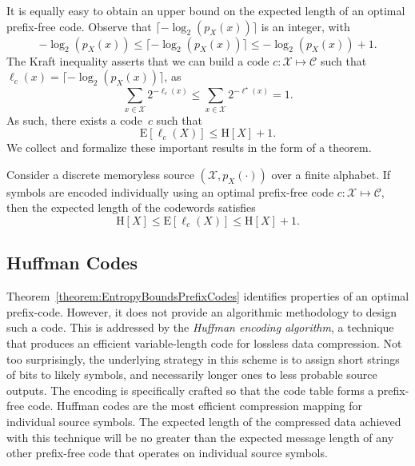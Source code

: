 It is equally easy to obtain an upper bound on the expected length of an optimal prefix-free code.
Observe that $\lceil - \log_2 (p_X(x)) \rceil$ is an integer, with
\begin{equation*}
- \log_2 (p_X(x))
\leq \lceil - \log_2 (p_X(x)) \rceil
\leq - \log_2 (p_X(x)) + 1 .
\end{equation*}
The Kraft inequality asserts that we can build a code $c : \mathcal{X} \mapsto \mathcal{C}$ such that $\ell_c(x) = \lceil - \log_2 (p_X(x)) \rceil$, as
\begin{equation*}
\sum_{x \in \mathcal{X}} 2^{- \ell_c(x)}
\leq \sum_{x \in \mathcal{X}} 2^{- \ell^{\star}(x)} = 1 .
\end{equation*}
As such, there exists a code~$c$ such that
\begin{equation*}
\mathrm{E} [\ell_c(X)] \leq \mathrm{H}[X] + 1 .
\end{equation*}
We collect and formalize these important results in the form of a theorem.

\begin{theorem} \label{theorem:EntropyBoundsPrefixCodes}
Consider a discrete memoryless source $(\mathcal{X}, p_X(\cdot))$ over a finite alphabet.
If symbols are encoded individually using an optimal prefix-free code $c : \mathcal{X} \mapsto \mathcal{C}$, then the expected length of the codewords satisfies
\begin{equation*}
\mathrm{H}[X] \leq \mathrm{E} [\ell_c(X)] \leq \mathrm{H}[X] + 1 .
\end{equation*}
\end{theorem}


\subsection{Huffman Codes}

Theorem~\ref{theorem:EntropyBoundsPrefixCodes} identifies properties of an optimal prefix-code.
However, it does not provide an algorithmic methodology to design such a code.
This is addressed by the \emph{Huffman encoding algorithm}, a technique that produces an efficient variable-length code for lossless data compression.
Not too surprisingly, the underlying strategy in this scheme is to assign short strings of bits to likely symbols, and necessarily longer ones to less probable source outputs.
The encoding is specifically crafted so that the code table forms a prefix-free code.
Huffman codes are the most efficient compression mapping for individual source symbols.
The expected length of the compressed data achieved with this technique will be no greater than the expected message length of any other prefix-free code that operates on individual source symbols.

